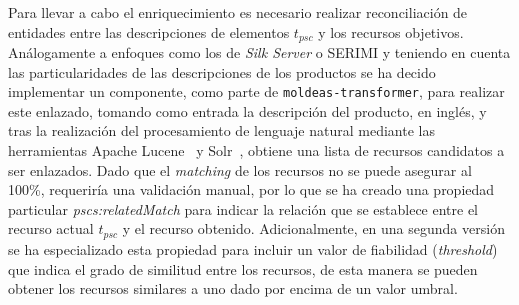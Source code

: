 Para llevar a cabo el enriquecimiento es necesario realizar reconciliación de entidades entre las descripciones 
de elementos $t_{psc}$ y los recursos objetivos. Análogamente a enfoques como los de \textit{Silk Server} o SERIMI y teniendo 
en cuenta las particularidades de las descripciones de los productos se ha decido implementar un componente, 
como parte de \texttt{moldeas-transformer}, para realizar este enlazado, tomando como entrada la descripción del producto, en inglés, y tras 
la realización del procesamiento de lenguaje natural mediante las herramientas Apache \gls{Lucene}~\cite{Hatcher:2004:LA:1044938} y \gls{Solr}~\cite{solr}, obtiene una lista de recursos 
candidatos a ser enlazados. Dado que el \textit{matching} de los recursos no se puede asegurar al 100\%, requeriría una validación manual, 
por lo que se ha creado una propiedad particular \textit{pscs:relatedMatch} para indicar la relación que se establece entre el recurso 
actual $t_{psc}$ y el recurso obtenido. Adicionalmente, en una segunda versión se ha especializado esta propiedad para incluir 
un valor de fiabilidad (\textit{threshold}) que indica el grado de similitud entre los recursos, de esta manera se pueden obtener 
los recursos similares a uno dado por encima de un valor umbral.

